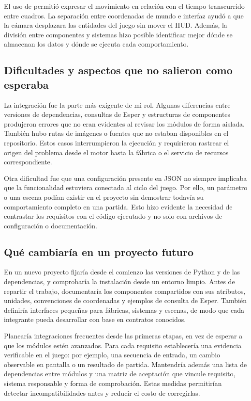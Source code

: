 \documentclass[12pt,letterpaper]{article}
\newcommand{\archivo}[1]{\texttt{\detokenize{#1}}}
\begin{document}
El uso de \archivo{delta_time} permitió expresar el movimiento en relación con el tiempo transcurrido entre cuadros. La separación entre coordenadas de mundo e interfaz ayudó a que la cámara desplazara las entidades del juego sin mover el HUD. Además, la división entre componentes y sistemas hizo posible identificar mejor dónde se almacenan los datos y dónde se ejecuta cada comportamiento.

\subsection{Dificultades y aspectos que no salieron como esperaba}

La integración fue la parte más exigente de mi rol. Algunas diferencias entre versiones de dependencias, consultas de Esper y estructuras de componentes produjeron errores que no eran evidentes al revisar los módulos de forma aislada. También hubo rutas de imágenes o fuentes que no estaban disponibles en el repositorio. Estos casos interrumpieron la ejecución y requirieron rastrear el origen del problema desde el motor hasta la fábrica o el servicio de recursos correspondiente.

Otra dificultad fue que una configuración presente en JSON no siempre implicaba que la funcionalidad estuviera conectada al ciclo del juego. Por ello, un parámetro o una escena podían existir en el proyecto sin demostrar todavía su comportamiento completo en una partida. Esto hizo evidente la necesidad de contrastar los requisitos con el código ejecutado y no solo con archivos de configuración o documentación.

\subsection{Qué cambiaría en un proyecto futuro}

En un nuevo proyecto fijaría desde el comienzo las versiones de Python y de las dependencias, y comprobaría la instalación desde un entorno limpio. Antes de repartir el trabajo, documentaría los componentes compartidos con sus atributos, unidades, convenciones de coordenadas y ejemplos de consulta de Esper. También definiría interfaces pequeñas para fábricas, sistemas y escenas, de modo que cada integrante pueda desarrollar con base en contratos conocidos.

Planearía integraciones frecuentes desde las primeras etapas, en vez de esperar a que los módulos estén avanzados. Para cada requisito establecería una evidencia verificable en el juego: por ejemplo, una secuencia de entrada, un cambio observable en pantalla o un resultado de partida. Mantendría además una lista de dependencias entre módulos y una matriz de aceptación que vincule requisito, sistema responsable y forma de comprobación. Estas medidas permitirían detectar incompatibilidades antes y reducir el costo de corregirlas.
\end{document}
